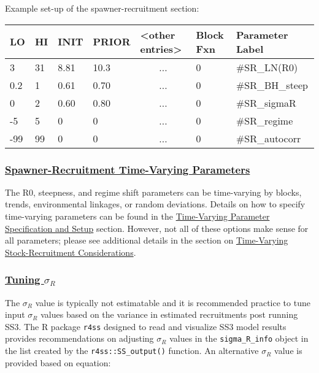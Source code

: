 Example set-up of the spawner-recruitment section:
\begin{center}
	\begin{longtable}{p{1cm} p{1cm} p{1cm} p{1.5cm} p{3cm} p{2cm} p{3.5cm}}
		
		\hline
		LO \Tstrut & HI & INIT & PRIOR & <other entries> & Block Fxn & Parameter Label \Bstrut\\
		\hline
		3   & 31 & 8.81 & 10.3 & \multicolumn{1}{c}{...} & 0 & \#SR\_LN(R0) \Tstrut\\
		0.2 & 1  & 0.61 & 0.70 & \multicolumn{1}{c}{...} & 0 & \#SR\_BH\_steep \\
		0   & 2  & 0.60 & 0.80 & \multicolumn{1}{c}{...} & 0 & \#SR\_sigmaR \\
		-5  & 5  & 0    & 0    & \multicolumn{1}{c}{...} & 0 & \#SR\_regime \\
		-99 & 99 & 0    & 0    & \multicolumn{1}{c}{...} & 0 & \#SR\_autocorr \Bstrut\\
		\hline
	\end{longtable}
\end{center}
\vspace*{-1.7\baselineskip}

\hypertarget{SRR-TV}{}
\subsubsection[Spawner-Recruitment Time-Varying Parameters]{\protect\hyperlink{SRR-TV}{Spawner-Recruitment Time-Varying Parameters}}

The R0, steepness, and regime shift parameters can be time-varying by blocks, trends, environmental linkages, or random deviations. Details on how to specify time-varying parameters can be found in the \hyperlink{tvOrder}{Time-Varying Parameter Specification and Setup} section. However, not all of these options make sense for all parameters; please see additional details in the section on \hyperlink{tv-sr}{Time-Varying Stock-Recruitment Considerations}.

\hypertarget{TuneSigmaR}{}
\subsubsection[Tuning $\sigma_R$]{\protect\hyperlink{TuneSigmaR}{Tuning $\sigma_R$}}
The $\sigma_R$ value is typically not estimatable and it is recommended practice to tune input $\sigma_R$ values based on the variance in estimated recruitments post running SS3. The R package \texttt{r4ss} designed to read and visualize SS3 model results provides recommendations on adjusting $\sigma_R$ values in the \texttt{sigma\_R\_info} object in the list created by the \texttt{r4ss::SS\_output()} function. An alternative $\sigma_R$ value is provided based on equation:

